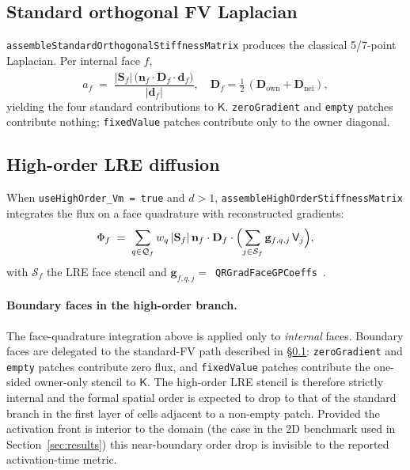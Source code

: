 \documentclass[11pt,a4paper]{article}
\newcommand{\Dten}{\mathbf{D}}
\newcommand{\Kstif}{\mathsf{K}}
\newcommand{\code}[1]{\texttt{\small #1}}
\begin{document}
\subsection{Standard orthogonal FV Laplacian}
\label{sec:stdFV}

\code{assembleStandardOrthogonalStiffnessMatrix} produces the classical
5/7-point Laplacian. Per internal face $f$,
\begin{equation}
  a_{f} \;=\;
   \frac{ \lvert \mathbf{S}_{f} \rvert\,
          \bigl( \mathbf{n}_{f} \cdot \Dten_{f} \cdot \hat{\mathbf{d}}_{f} \bigr) }
        { \lvert \mathbf{d}_{f} \rvert },
   \quad
   \Dten_{f} = \tfrac{1}{2}\,(\Dten_{\text{own}} + \Dten_{\text{nei}}),
\end{equation}
yielding the four standard contributions to $\Kstif$. \code{zeroGradient}
and \code{empty} patches contribute nothing; \code{fixedValue} patches
contribute only to the owner diagonal.

\subsection{High-order LRE diffusion}

When \code{useHighOrder\_Vm = true} and $d > 1$,
\code{assembleHighOrderStiffnessMatrix} integrates the flux on a face
quadrature with reconstructed gradients:
\begin{equation}
  \Phi_{f} \;=\;
   \sum_{q \in \mathcal{Q}_{f}}
       w_{q}\, \lvert \mathbf{S}_{f} \rvert\,
       \mathbf{n}_{f} \cdot \Dten_{f} \cdot
       \Bigl(
         \sum_{j \in \mathcal{S}_{f}}
            \mathbf{g}_{f,q,j}\, \mathsf{V}_{j}
       \Bigr),
\end{equation}
with $\mathcal{S}_{f}$ the LRE face stencil and
$\mathbf{g}_{f,q,j} = $~\code{QRGradFaceGPCoeffs}~\cite{cardiff2018s4f}.

\paragraph{Boundary faces in the high-order branch.}
The face-quadrature integration above is applied only to
\emph{internal} faces. Boundary faces are delegated to the standard-FV
path described in \S\ref{sec:stdFV}: \code{zeroGradient} and
\code{empty} patches contribute zero flux, and \code{fixedValue}
patches contribute the one-sided owner-only stencil to $\Kstif$. The
high-order LRE stencil is therefore strictly internal and the
formal spatial order is expected to drop to that of the standard
branch in the first layer of cells adjacent to a non-empty patch.
Provided the activation front is interior to the domain (the case in
the 2D benchmark used in Section~\ref{sec:results}) this near-boundary
order drop is invisible to the reported activation-time metric.
\end{document}
